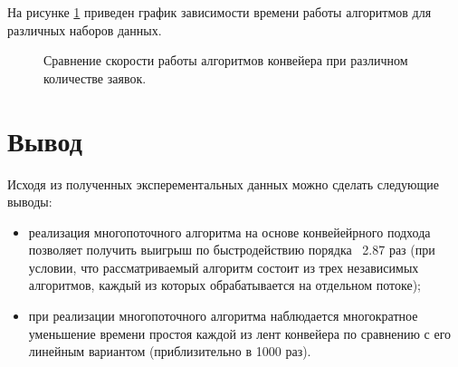На рисунке \ref{plt:time} приведен график зависимости времени работы алгоритмов для различных наборов данных.

\begin{figure}[!h]
	\centering
	\captionsetup{justification=centering}
	\caption{Сравнение скорости работы алгоритмов конвейера при различном количестве заявок.}
	\label{plt:time}
\end{figure}


\captionsetup{singlelinecheck = false, justification=centering}


\section{Вывод}

Исходя из полученных эксперементальных данных можно сделать следующие выводы:
\begin{itemize}
	\item реализация многопоточного алгоритма на основе конвейейрного подхода позволяет получить выигрыш по быстродействию порядка ~2.87 раз (при условии, что рассматриваемый алгоритм состоит из трех независимых алгоритмов, каждый из которых обрабатывается на отдельном потоке);
	\item при реализации многопоточного алгоритма наблюдается многократное уменьшение времени простоя каждой из лент конвейера по сравнению с его линейным вариантом (приблизительно в 1000 раз).
\end{itemize}


